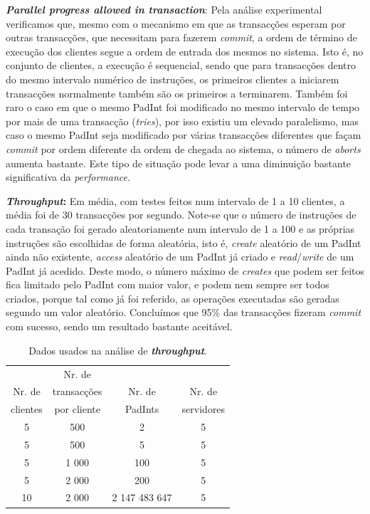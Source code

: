 \begin{description}
\item{\textbf{\textit{Parallel progress allowed in transaction}}:}
Pela análise experimental verificamos que, mesmo com o mecanismo em que as transacções esperam por outras transacções, que necessitam para fazerem \textit{commit}, a ordem de término de execução dos clientes segue a ordem de entrada dos mesmos no sistema. Isto é, no conjunto de clientes, a execução é sequencial, sendo que para transacções dentro do mesmo intervalo numérico de instruções, os primeiros clientes a iniciarem transacções normalmente também são os primeiros a terminarem. Também foi raro o caso em que o mesmo PadInt foi modificado no mesmo intervalo de tempo por mais de uma transacção (\textit{tries}), por isso existiu um elevado paralelismo, mas caso o mesmo PadInt seja modificado por várias transacções diferentes que façam \textit{commit} por ordem diferente da ordem de chegada ao sistema,  o número de \textit{aborts} aumenta bastante. Este tipo de situação pode levar a uma diminuição bastante significativa da \textit{performance}.

\item{\textbf{\textit{Throughput}:}} 
Em média, com testes feitos num intervalo de 1 a 10 clientes, a média foi de 30 transacções por segundo.  Note-se que o número de instruções de cada transação foi gerado aleatoriamente num intervalo de 1 a 100 e as próprias instruções são escolhidas de forma aleatória, isto é, \textit{create} aleatório de um PadInt ainda não existente, \textit{access} aleatório de um PadInt já criado e \textit{read}/\textit{write} de um PadInt já acedido. Deste modo, o número máximo de \textit{creates} que podem ser feitos fica limitado pelo PadInt com maior valor, e podem nem sempre ser todos criados, porque tal como já foi referido, as operações executadas são geradas segundo um valor aleatório. Concluímos que 95\% das transacções fizeram \textit{commit} com sucesso, sendo um resultado bastante aceitável.

\begin{table}[htb]
\centering
\begin{tabular}{c|c|c|c}
 & Nr. de & & \\
 Nr. de& transacções &  Nr. de & Nr. de \\
clientes & por cliente & PadInts & servidores \\\hline
5 & 500 & 2 & 5\\
5 & 500 & 5 & 5\\
5 & 1 000 & 100 & 5\\
5 & 2 000 & 200 & 5\\
10 & 2 000 & 2 147 483 647 & 5\\
\end{tabular}
\caption{\label{tab:throughput}Dados usados na análise de \textbf{\textit{throughput}}.}
\end{table}


\end{description}
